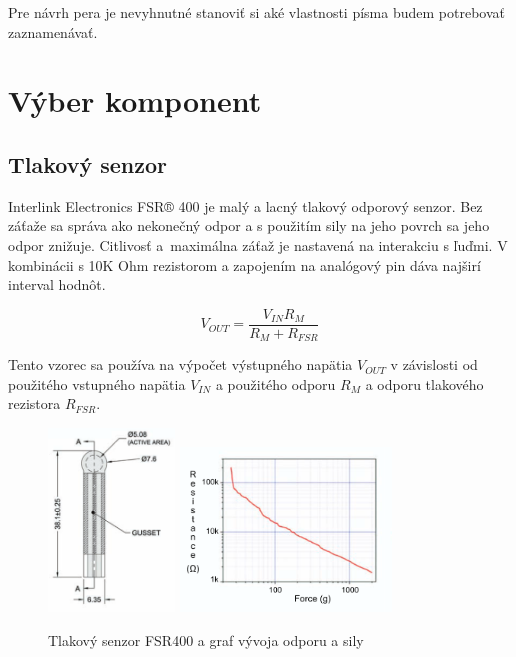 Pre návrh pera je nevyhnutné stanoviť si aké vlastnosti písma budem potrebovať zaznamenávať. 

\section{Výber komponent}

\subsection*{Tlakový senzor}

Interlink Electronics FSR® 400 je malý a lacný tlakový odporový senzor. Bez záťaže sa správa ako nekonečný odpor a s použitím sily na jeho povrch sa jeho odpor znižuje. Citlivosť a~maximálna záťaž je nastavená na interakciu s ľuďmi. \cite{fsr400} V kombinácii s 10K Ohm rezistorom a zapojením na analógový pin dáva najširí interval hodnôt. 

\[
V_{OUT} = \frac{V_{IN} R_M} {R_M + R_{FSR}}
\]

Tento vzorec sa používa na výpočet výstupného napätia $V_{OUT}$ v závislosti od použitého vstupného napätia $V_{IN}$ a použitého odporu $R_M$ a odporu tlakového rezistora $R_{FSR}$.

\begin{figure}[hbt]
	\centering
	\includegraphics[width=0.3\textwidth]{obrazky-figures/fsr400.png}
	\includegraphics[width=0.5\textwidth]{obrazky-figures/FSRodporSila.png}
	\caption{Tlakový senzor FSR400 a graf vývoja odporu a sily}
	\label{Odpor sila}
\end{figure}

